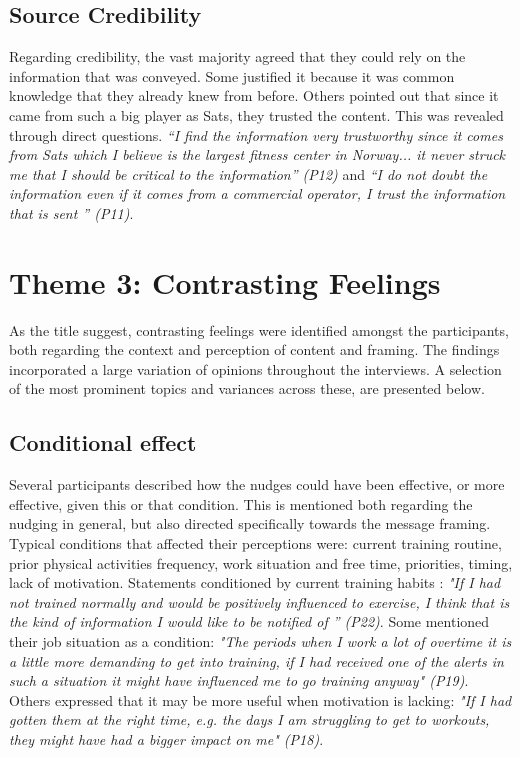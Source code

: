\subsection{Source Credibility}
Regarding credibility, the vast majority agreed that they could rely on the information that was conveyed. Some justified it because it was common knowledge that they already knew from before. Others pointed out that since it came from such a big player as Sats, they trusted the content. This was revealed through direct questions. \textit{“I find the information very trustworthy since it comes from Sats which I believe is the largest fitness center in Norway... it never struck me that I should be critical to the information” (P12)} and \textit{“I do not doubt the information even if it comes from a commercial operator, I trust the information that is sent ” (P11)}.

\section{Theme 3: Contrasting Feelings}
As the title suggest, contrasting feelings were identified amongst the participants, both regarding the context and perception of content and framing. The findings incorporated a large variation of opinions throughout the interviews. A selection of the most prominent topics and variances across these, are presented below. 

\subsection{Conditional effect}
Several participants described how the nudges could have been effective, or more effective, given this or that condition. This is mentioned both regarding the nudging in general, but also directed specifically towards the message framing. Typical conditions that affected their perceptions were: current training routine, prior physical activities frequency, work situation and free time, priorities, timing, lack of motivation. Statements conditioned by current training habits : \textit{"If I had not trained normally and would be positively influenced to exercise, I think that is the kind of information I would like to be notified of ” (P22)}. Some mentioned their job situation as a condition: \textit{"The periods when I work a lot of overtime it is a little more demanding to get into training, if I had received one of the alerts in such a situation it might have influenced me to go  training anyway" (P19)}. Others expressed that it may be more useful when motivation is lacking: \textit{"If I had gotten them at the right time, e.g. the days I am struggling to get to workouts, they might have had a bigger impact on me" (P18)}.

